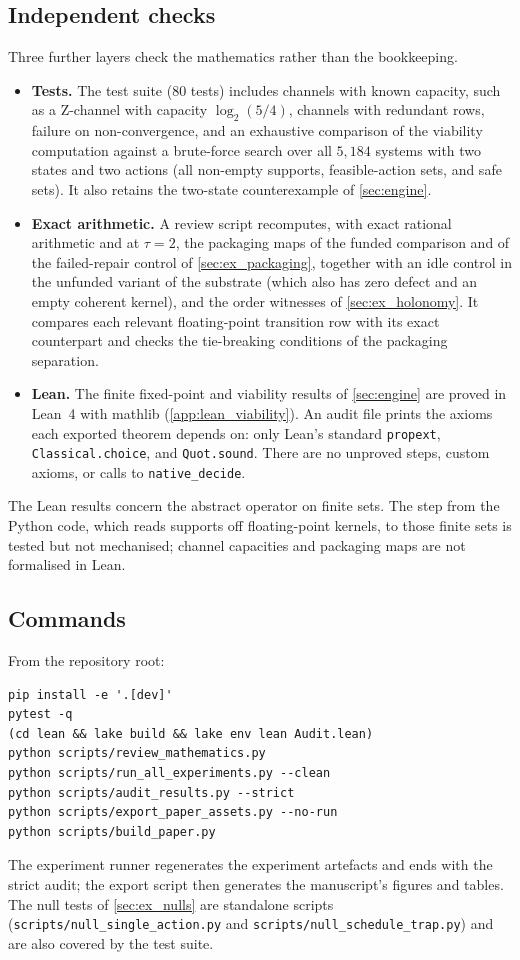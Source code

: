 \subsection{Independent checks}
Three further layers check the mathematics rather than the bookkeeping.
\begin{itemize}[leftmargin=*, itemsep=0.25em]
  \item \textbf{Tests.} The test suite (80 tests) includes channels with known capacity, such as a Z-channel with capacity $\log_2(5/4)$, channels with redundant rows, failure on non-convergence, and an exhaustive comparison of the viability computation against a brute-force search over all $5{,}184$ systems with two states and two actions (all non-empty supports, feasible-action sets, and safe sets). It also retains the two-state counterexample of \cref{sec:engine}.
  \item \textbf{Exact arithmetic.} A review script recomputes, with exact rational arithmetic and at $\tau=2$, the packaging maps of the funded comparison and of the failed-repair control of \cref{sec:ex_packaging}, together with an idle control in the unfunded variant of the substrate (which also has zero defect and an empty coherent kernel), and the order witnesses of \cref{sec:ex_holonomy}. It compares each relevant floating-point transition row with its exact counterpart and checks the tie-breaking conditions of the packaging separation.
  \item \textbf{Lean.} The finite fixed-point and viability results of \cref{sec:engine} are proved in Lean~4 with mathlib \citep{demoura2021lean4,mathlib2019} (\cref{app:lean_viability}). An audit file prints the axioms each exported theorem depends on: only Lean's standard \texttt{propext}, \texttt{Classical.choice}, and \texttt{Quot.sound}. There are no unproved steps, custom axioms, or calls to \texttt{native\_decide}.
\end{itemize}
The Lean results concern the abstract operator on finite sets. The step from the Python code, which reads supports off floating-point kernels, to those finite sets is tested but not mechanised; channel capacities and packaging maps are not formalised in Lean.

\subsection{Commands}
From the repository root:
\begin{verbatim}
pip install -e '.[dev]'
pytest -q
(cd lean && lake build && lake env lean Audit.lean)
python scripts/review_mathematics.py
python scripts/run_all_experiments.py --clean
python scripts/audit_results.py --strict
python scripts/export_paper_assets.py --no-run
python scripts/build_paper.py
\end{verbatim}
The experiment runner regenerates the experiment artefacts and ends with the strict audit; the export script then generates the manuscript's figures and tables. The null tests of \cref{sec:ex_nulls} are standalone scripts (\texttt{scripts/null\_single\_action.py} and \texttt{scripts/null\_schedule\_trap.py}) and are also covered by the test suite.
